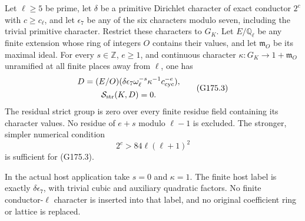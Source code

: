 \begin{theorem}
\label{AC-G175}
Let $\ell\geq5$ be prime, let $\delta$ be a primitive Dirichlet
character of exact conductor $2^c$ with $c\geq c_\ell$, and let
$\epsilon_7$ be any of the six characters modulo seven, including
the trivial primitive character.  Restrict these characters to $G_K$.
Let $E/\mathbb Q_\ell$ be any finite extension whose ring of integers
$O$ contains their values, and let $\mathfrak m_O$ be its maximal ideal.
For every $s\in\mathbb Z$, $e\geq1$, and continuous character
$\kappa:G_K\to1+\mathfrak m_O$ unramified at all finite places away
from $\ell$, one has
\[
 \begin{gathered}
 D=(E/O)(\delta\epsilon_7\omega_\ell^{-s}
                          \kappa^{-1}c_{\rm cyc}^{-e}),\\
                         \mathcal S_{\rm str}(K,D)=0.
 \end{gathered}
 \tag{G175.3}
\]
The residual strict group is zero over every finite residue field
containing its character values.  No residue of $e+s$ modulo
$\ell-1$ is excluded.  The stronger, simpler numerical condition
\[
                         2^c>84\ell(\ell+1)^2
 \tag{G175.4}
\]
is sufficient for (G175.3).

In the actual host application take $s=0$ and $\kappa=1$.
The finite host label is exactly $\delta\epsilon_7$, with trivial
cubic and auxiliary quadratic factors.  No finite conductor-$\ell$
character is inserted into that label, and no original coefficient
ring or lattice is replaced.
\end{theorem}

